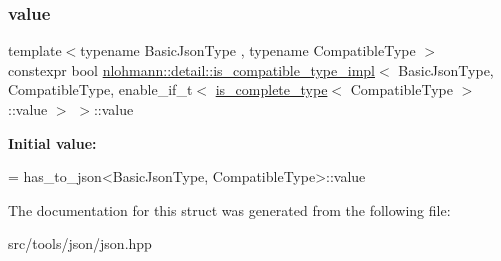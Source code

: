 \subsubsection{\texorpdfstring{value}{value}}
{\footnotesize\ttfamily template$<$typename Basic\+Json\+Type , typename Compatible\+Type $>$ \\
constexpr bool \hyperlink{structnlohmann_1_1detail_1_1is__compatible__type__impl}{nlohmann\+::detail\+::is\+\_\+compatible\+\_\+type\+\_\+impl}$<$ Basic\+Json\+Type, Compatible\+Type, enable\+\_\+if\+\_\+t$<$ \hyperlink{structnlohmann_1_1detail_1_1is__complete__type}{is\+\_\+complete\+\_\+type}$<$ Compatible\+Type $>$\+::value $>$ $>$\+::value\hspace{0.3cm}{\ttfamily [static]}}

{\bfseries Initial value\+:}
\begin{DoxyCode}
=
        has\_to\_json<BasicJsonType, CompatibleType>::value
\end{DoxyCode}


The documentation for this struct was generated from the following file\+:\begin{DoxyCompactItemize}
\item 
src/tools/json/json.\+hpp\end{DoxyCompactItemize}
